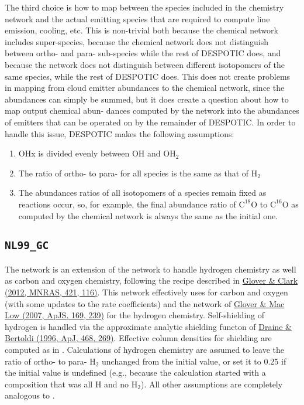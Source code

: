 \documentclass[letterpaper,10pt,english]{sphinxmanual}
\begin{document}
The third choice is how to map between the species included in the
chemistry network and the actual emitting species that are required
to compute line emission, cooling, etc. This is non-trivial both
because the chemical network includes super-species, because the
chemical network does not distinguish between ortho- and para-
sub-species while the rest of DESPOTIC does, and because the network
does not distinguish between different isotopomers of the same
species, while the rest of DESPOTIC does. This does not create
problems in mapping from cloud emitter abundances to the chemical
network, since the abundances can simply be summed, but it does create
a question about how to map output chemical abun- dances computed by
the network into the abundances of emitters that can be operated on by
the remainder of DESPOTIC. In order to handle this issue, DESPOTIC
makes the following assumptions:
\begin{enumerate}
\item {} 
OHx is divided evenly between OH and \(\mathrm{OH}_2\)

\item {} 
The ratio of ortho- to para- for all species is the same as that of
\(\mathrm{H}_2\)

\item {} 
The abundances ratios of all isotopomers of a species remain fixed
as reactions occur, so, for example, the final abundance ratio of
\(\mathrm{C}^{18}\mathrm{O}\) to
\(\mathrm{C}^{16}\mathrm{O}\) as computed by the chemical
network is always the same as the initial one.

\end{enumerate}


\subsection{\texttt{NL99\_GC}}
\label{chemistry:sssec-nl99-gc}\label{chemistry:nl99-gc}
The  network is an extension of the  network to
handle hydrogen chemistry as well as carbon and oxygen chemistry,
following the recipe described in \href{http://adsabs.harvard.edu/abs/2012MNRAS.421..116G}{Glover \& Clark (2012, MNRAS,
421, 116)}. This
network effectively uses  for carbon and oxygen (with some
updates to the rate coefficients) and the network of \href{http://adsabs.harvard.edu/abs/2007ApJS..169..239G}{Glover \& Mac Low
(2007, ApJS, 169, 239)}
for the hydrogen chemistry. Self-shielding of hydrogen is handled via
the approximate analytic shielding functon of \href{http://adsabs.harvard.edu/abs/1996ApJ...468..269D}{Draine \& Bertoldi
(1996, ApJ, 468, 269)}. Effective
column densities for shielding are computed as in .
Calculations of hydrogen chemistry are assumed to leave the ratio of
ortho- to para- \(\mathrm{H}_2\) unchanged from the initial value,
or set it to 0.25 if the initial value is undefined (e.g., because the
calculation started with a composition that was all H and no
\(\mathrm{H}_2\)). All other assumptions are completely analogous
to .
\end{document}

